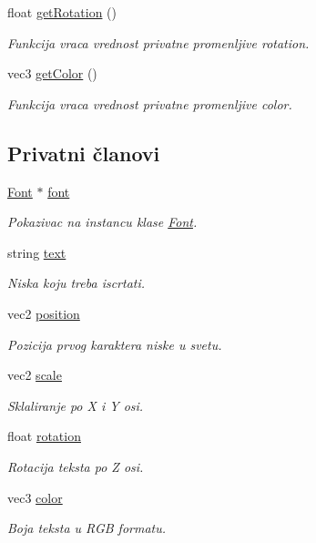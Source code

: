 \begin{DoxyCompactItemize}
float \hyperlink{classfont_1_1Text_a5e59176805cd037ae0c528b84703961c}{get\+Rotation} ()
\begin{DoxyCompactList}\small\item\em Funkcija vraca vrednost privatne promenljive rotation. \end{DoxyCompactList}\item 
vec3 \hyperlink{classfont_1_1Text_ae947a015d868f5750e28b10010b0cb9d}{get\+Color} ()
\begin{DoxyCompactList}\small\item\em Funkcija vraca vrednost privatne promenljive color. \end{DoxyCompactList}\end{DoxyCompactItemize}
\subsection*{Privatni članovi}
\begin{DoxyCompactItemize}
\item 
\hyperlink{classfont_1_1Font}{Font} $\ast$ \hyperlink{classfont_1_1Text_abcaa4524d10d18e780ff793cca49a168}{font}
\begin{DoxyCompactList}\small\item\em Pokazivac na instancu klase \hyperlink{classfont_1_1Font}{Font}. \end{DoxyCompactList}\item 
string \hyperlink{classfont_1_1Text_aee63974ff23d9e971bbd04fe041ccb07}{text}
\begin{DoxyCompactList}\small\item\em Niska koju treba iscrtati. \end{DoxyCompactList}\item 
vec2 \hyperlink{classfont_1_1Text_a65489ce0d1c13aaf242804987dba8b8d}{position}
\begin{DoxyCompactList}\small\item\em Pozicija prvog karaktera niske u svetu. \end{DoxyCompactList}\item 
vec2 \hyperlink{classfont_1_1Text_aec4f985d466d9f4b10cc426e393d6f14}{scale}
\begin{DoxyCompactList}\small\item\em Sklaliranje po X i Y osi. \end{DoxyCompactList}\item 
float \hyperlink{classfont_1_1Text_a4dc0a823fa5a8592b6d09e90b18226fb}{rotation}
\begin{DoxyCompactList}\small\item\em Rotacija teksta po Z osi. \end{DoxyCompactList}\item 
vec3 \hyperlink{classfont_1_1Text_a83c69eadc420a466aaade60393f35b24}{color}
\begin{DoxyCompactList}\small\item\em Boja teksta u R\+GB formatu. \end{DoxyCompactList}\end{DoxyCompactItemize}


